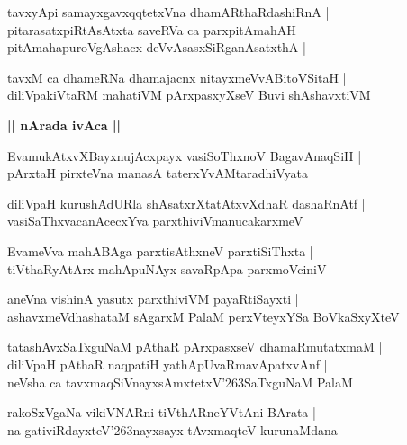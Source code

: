 \documentclass[twoside,12pt,openright]{book}
\def\S{\char'263}
\newcounter{shloka}[chapter]
\def\uvaca#1{\centerline{{\large\textbf{#1}}}}
\begin{document}
\begin{shloka}
tavxyApi samayxgavxqqtetxVna dhamARthaRdashiRnA |\\
pitarasatxpiRtAsAtxta saveRVa ca parxpitAmahAH \\
pitAmahapuroVgAshacx deVvAsasxSiRganAsatxthA |
\end{shloka}

\begin{shloka}
tavxM ca dhameRNa dhamajacnx nitayxmeVvABitoVSitaH |\\
diliVpakiVtaRM mahatiVM pArxpasxyXseV Buvi shAshavxtiVM 
\end{shloka}

\uvaca{ || nArada ivAca ||}

\begin{shloka}
EvamukAtxvXBayxnujAcxpayx vasiSoThxnoV BagavAnaqSiH |\\
pArxtaH pirxteVna manasA taterxYvAMtaradhiVyata 
\end{shloka}

\begin{shloka}
diliVpaH kurushAdURla shAsatxrXtatAtxvXdhaR dashaRnAtf |\\
vasiSaThxvacanAcecxYva parxthiviVmanucakarxmeV 
\end{shloka}

\begin{shloka}
EvameVva mahABAga parxtisAthxneV parxtiSiThxta |\\
tiVthaRyAtArx mahApuNAyx savaRpApa parxmoVciniV
\end{shloka}

\begin{shloka}
aneVna vishinA yasutx parxthiviVM payaRtiSayxti |\\
ashavxmeVdhashataM sAgarxM PalaM perxVteyxYSa BoVkaSxyXteV
\end{shloka}

\begin{shloka}
tatashAvxSaTxguNaM pAthaR pArxpasxseV dhamaRmutatxmaM |\\
diliVpaH pAthaR naqpatiH yathApUvaRmavApatxvAnf |\\
neVsha ca tavxmaqSiVnayxsAmxtetxV\S SaTxguNaM PalaM 
\end{shloka}

\begin{shloka}
rakoSxVgaNa vikiVNARni tiVthARneYVtAni BArata |\\
na gativiRdayxteV\S nayxsayx tAvxmaqteV kurunaMdana
\end{shloka}
\end{document}
